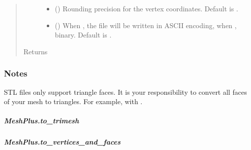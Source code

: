 \documentclass[letterpaper,10pt,english]{sphinxmanual}
\begin{document}
\begin{fulllineitems}
\begin{fulllineitems}
\begin{quote}
\begin{description}
\begin{itemize}
\item {} 
 () \textendash{} Rounding precision for the vertex coordinates.
Default is .

\item {} 
 () \textendash{} When , the file will be written in ASCII encoding,
when , binary.  Default is .

\end{itemize}

\item[{Returns}] \leavevmode
{}

\end{description}\end{quote}
\subsubsection*{Notes}

STL files only support triangle faces.
It is your responsibility to convert all faces of your mesh to triangles.
For example, with .

\end{fulllineitems}



\subparagraph{MeshPlus.to\_trimesh}
\label{\detokenize{api/generated/directional_clustering.mesh.MeshPlus.to_trimesh:meshplus-to-trimesh}}\label{\detokenize{api/generated/directional_clustering.mesh.MeshPlus.to_trimesh::doc}}

\begin{fulllineitems}
\label{\detokenize{api/generated/directional_clustering.mesh.MeshPlus.to_trimesh:directional_clustering.mesh.MeshPlus.to_trimesh}}
\end{fulllineitems}



\subparagraph{MeshPlus.to\_vertices\_and\_faces}
\label{\detokenize{api/generated/directional_clustering.mesh.MeshPlus.to_vertices_and_faces:meshplus-to-vertices-and-faces}}\label{\detokenize{api/generated/directional_clustering.mesh.MeshPlus.to_vertices_and_faces::doc}}


\end{fulllineitems}
\end{document}
